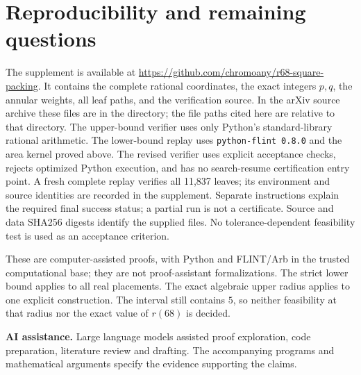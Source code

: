 \documentclass[11pt]{article}
\begin{document}
\section{Reproducibility and remaining questions}
The supplement is available at \url{https://github.com/chromoany/r68-square-packing}. It contains the complete rational coordinates, the exact integers $p,q$, the annular weights, all leaf paths, and the verification source. In the arXiv source archive these files are in the  directory; the file paths cited here are relative to that directory. The upper-bound verifier uses only Python's standard-library rational arithmetic. The lower-bound replay uses \texttt{python-flint 0.8.0} and the area kernel proved above. The revised verifier uses explicit acceptance checks, rejects optimized Python execution, and has no search-resume certification entry point. A fresh complete replay verifies all 11,837 leaves; its environment and source identities are recorded in the supplement. Separate instructions explain the required final success status; a partial run is not a certificate. Source and data SHA256 digests identify the supplied files. No tolerance-dependent feasibility test is used as an acceptance criterion.

These are computer-assisted proofs, with Python and FLINT/Arb in the trusted computational base; they are not proof-assistant formalizations. The strict lower bound applies to all real placements. The exact algebraic upper radius applies to one explicit construction. The interval still contains $5$, so neither feasibility at that radius nor the exact value of $r(68)$ is decided.

\medskip
\noindent\textbf{AI assistance.} Large language models assisted proof exploration, code preparation, literature review and drafting. The accompanying programs and mathematical arguments specify the evidence supporting the claims.

\FloatBarrier
\begingroup
\raggedright

\endgroup
\end{document}
